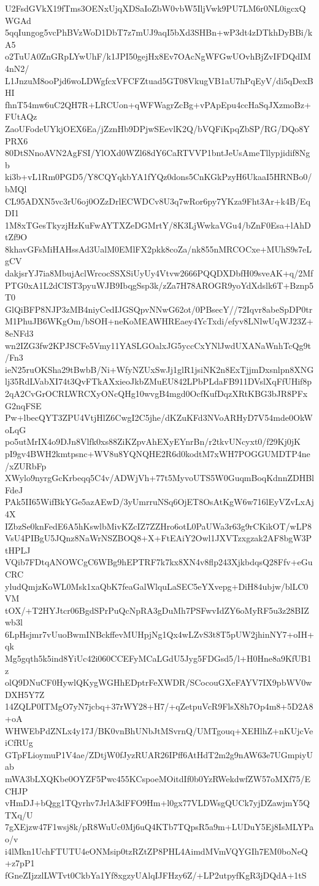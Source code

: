 U2FsdGVkX19fTms3OENxUjqXDSaIoZbW0vbW5IljVwk9PU7LM6r0NL0igcxQWGAd
5qqIungog5vcPhBVzWoD1DbT7z7mUJ9aqI5bXd3SHBn+wP3dt4zDTkhDyBBi/kA5
o2TuUA0ZnGRpLYwUhF/k1JPI50gejHx8Ev7OAcNgWFGwUOvhBjZvIFDQdIM4nN2/
L1JnzuM8ooPjd6woLDWgfcxVFCFZtuad5GT08VkugVB1aU7hPqEyV/di5qDexBHI
fhnT54mw6uC2QH7R+LRCUon+qWFWagrZcBg+vPApEpu4ccHaSqJXzmoBz+FUtAQz
ZaoUFodeUYkjOEX6Ea/jZznHb9DPjwSEevlK2Q/bVQFiKpqZbSP/RG/DQo8YPRX6
80DtSNnoAVN2AgFSI/YlOXd0WZl68dY6CaRTVVP1bntJeUsAmeTllypjidif8Ngb
ki3b+vL1Rm0PGD5/Y8CQYqkbYA1fYQz0dons5CnKGkPzyH6UkaaI5HRNBo0/bMQl
CL95ADXN5vc3rU6oj0OZzDrlECWDCv8U3q7wRor6py7YKza9Fht3Ar+k4B/EqDI1
1M8xTGesTkyzjHzKuFwAYTXZeDGMrtY/8K3LjWwkaVGu4/bZnF0Esa+lAhDtZf9O
8khavGFsMiHAHssAd3UalM0EMlFX2pkk8coZa/nk855nMRCOCxe+MUhS9s7eLgCV
dakjsrYJ7ia8MbujAclWrcocSSXSiUyUy4Vtvw2666PQQDXDbfH09sveAK+q/2Mf
PTG0xA1L2dCIST3pyuWJB9IbqgSsp3k/zZa7H78AROGR9yoYdXdslk6T+Bznp5T0
GlQiBFP8NJP3zMB4niyCedIJGSQpvNNwG62ot/0PBsecY//72Iqvr8abeSpDP0tr
M1PhuJB6WKgOm/bSOH+neKoMEAWHREaey4YcTxdi/efyv8LNlwUqWJ23Z+8eNFd3
wn2IZG3fw2KPJSCFe5Vmy11YASLGOalxJG5yccCxYNlJwdUXANaWnhTcQg9t/Fn3
ieN25ruOKSha29tBwbB/Ni+WfyNZUxSwJj1glR1jsiNK2n8ExTjjmDxsnlpn8XNG
lj35RdLVabXI74t3QvFTkAXxieoJkbZMuEU842LPbPLdaFB911DVslXqFfUHif8p
2qA2CvGrOCRLWRCXyONcQHg10wvgB4mgd0OcfKufDqzXRtKBG3bJR8PFxG2nqFSE
Pw+lbecQYT3ZPU4VtjHlZ6CwgI2C5jhe/dKZuKFd3NVoARHyD7V54mde0OkWoLqG
po5utMrIX4o9DJn8Vlfk0xs88ZiKZpvAhEXyEYnrBn/r2tkvUNcyxt0/f29Kj0jK
pI9gv4BWH2kmtpsnc+WV8u8YQNQHE2R6d0kodtM7xWH7POGGUMDTP4ne/xZURbFp
XWylo9nyrgGcKrbeqq5C4v/ADWjVh+77t5MyvoUTS5W0GuqmBoqKdnnZDHBlFdeJ
PAk5II65WifBkYGe5azAEwD/3yUmrruNSq6OjET8OsAtKgW6w716lEyVZvLxAj4X
IZbzSe0knFedE6A5hKswlbMivKZcIZ7ZZHro6otL0PaUWa3r63g9rCKikOT/wLP8
VsU4PIBgU5JQnz8NaWrNSZBOQ8+X+FtEAiY2Owl1JXVTzxgzak2AF8bgW3PtHPLJ
VQib7FDtqANOWCgC6WBg9hEPTRF7k7kx8XN4v8flp243XjkbdqsQ28Ffv+eGuCRC
yludQmjzKoWL0Msk1xaQbK7feaGalWlquLaSEC5eYXvepg+DiH84ubjw/blLC0VM
tOX/+T2HYJtcr06BgdSPrPuQcNpRA3gDuMh7PSFwvIdZY6oMyRF5u3z28BIZwb3l
6LpHsjmr7vUuoBwmINBckffevMUHpjNg1Qx4wLZvS3t8T5pUW2jhinNY7+oIH+qk
Mg5gqth5k5ind8YiUc42i060CCEFyMCaLGdU5Jyg5FDGsd5/l+H0Hne8a9KfUB1z
olQ9DNuCF0HywlQKygWGHhEDptrFeXWDR/SCocouGXeFAYV7IX9pbWV0wDXH5Y7Z
14ZQLP0ITMgO7yN7jcbq+37rWY28+H7/+qZetpuVcR9FlsX8h7Op4m8+5D2A8+oA
WHWEbPdZNLx4y17J/BK0vnBhUNbJtMSvrnQ/UMTgouq+XEHlhZ+nKUjcVeiCfRUg
GTpFLioymuP1V4ae/ZDtjW0fJyzRUAR26IPff6AtHdT2m2g9nAW63e7UGmpiyUab
mWA3bLXQKbe0OYZF5Pwc455KCspoeMOitdIf0b0YzRWekdwfZW57oMXf75/ECHJP
vHmDJ+bQgg1TQyrhv7JrlA3dFFO9Hm+l0gx77VLDWsgQUCk7yjDZawjmY5QTXq/U
7gXEjzw47F1wsj8k/pR8WuUc0Mj6uQ4KTb7TQpsR5a9m+LUDuY5Ej8IsMLYPao/v
i4lMkn1UchFTUTU4eONMsip0tzRZtZP8PHL4AimdMVmVQYGIh7EM0boNeQ+z7pP1
fGneZIjzzlLWTvt0CkbYa1Yf8xgzyUAlqIJFHzy6Z/+LP2utpyfKgR3jDQdA+1tS
